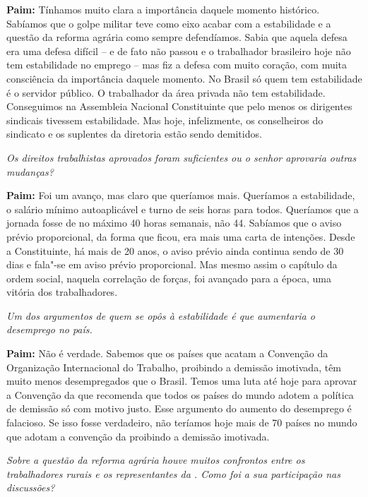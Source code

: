 \textbf{Paim:} Tínhamos muito clara a importância daquele momento
histórico. Sabíamos que o golpe militar teve como eixo acabar com a
estabilidade e a questão da reforma agrária como sempre defendíamos.
Sabia que aquela defesa era uma defesa difícil -- e de fato não passou e
o trabalhador brasileiro hoje não tem estabilidade no emprego -- mas fiz
a defesa com muito coração, com muita consciência da importância daquele
momento. No Brasil só quem tem estabilidade é o servidor público. O
trabalhador da área privada não tem estabilidade. Conseguimos na
Assembleia Nacional Constituinte que pelo menos os dirigentes sindicais
tivessem estabilidade. Mas hoje, infelizmente, os conselheiros do
sindicato e os suplentes da diretoria estão sendo demitidos.

\emph{Os direitos trabalhistas aprovados foram suficientes ou o senhor
aprovaria outras mudanças?}

\textbf{Paim:} Foi um avanço, mas claro que queríamos mais. Queríamos a
estabilidade, o salário mínimo autoaplicável e turno de seis horas para
todos. Queríamos que a jornada fosse de no máximo 40 horas semanais, não
44. Sabíamos que o aviso prévio proporcional, da forma que ficou, era
mais uma carta de intenções. Desde a Constituinte, há mais de 20 anos, o
aviso prévio ainda continua sendo de 30 dias e fala"-se em aviso prévio
proporcional. Mas mesmo assim o capítulo da ordem social, naquela
correlação de forças, foi avançado para a época, uma vitória dos
trabalhadores.

\emph{Um dos argumentos de quem se opôs à estabilidade é que
aumentaria o desemprego no país.}

\textbf{Paim:} Não é verdade. Sabemos que os países que acatam a
Convenção da Organização Internacional do Trabalho, proibindo a demissão
imotivada, têm muito menos desempregados que o Brasil. Temos uma luta
até hoje para aprovar a Convenção da  que recomenda que todos os
países do mundo adotem a política de demissão só com motivo justo. Esse
argumento do aumento do desemprego é falacioso. Se isso fosse
verdadeiro, não teríamos hoje mais de 70 países no mundo que adotam a
convenção da  proibindo a demissão imotivada.

\emph{Sobre a questão da reforma agrária houve muitos confrontos entre
os trabalhadores rurais e os representantes da . Como foi a sua
participação nas discussões?}

